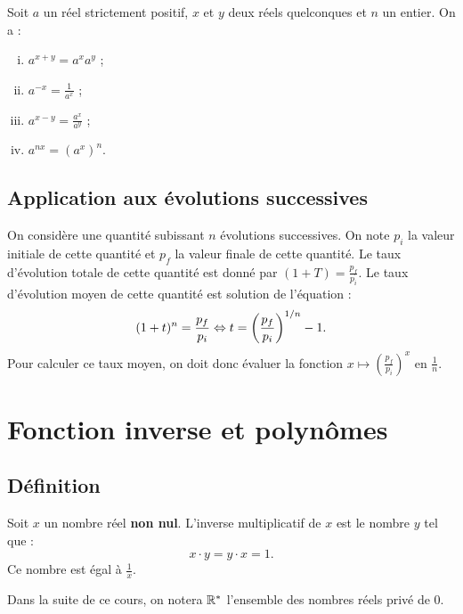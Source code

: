 \documentclass[a4paper, 12pt]{report}
\begin{document}
\begin{prop}
Soit $a$ un réel strictement positif, $x$ et $y$ deux réels quelconques et $n$ un entier. On a :
\begin{enumerate}[(i)]
\item
$a^{x+y} = a^x a^y$ ;
\item
$a^{-x} = \frac1{a^x}$ ;
\item
$a^{x-y} = \frac{a^x}{a^y}$ ;
\item
$a^{nx} = (a^x)^n$.
\end{enumerate}
\end{prop}

\section{Application aux évolutions successives}

\begin{prop}
On considère une quantité subissant $n$ évolutions successives. 
On note $p_i$ la valeur initiale de cette quantité et $p_f$ la valeur finale de cette quantité. \newline
Le taux d'évolution totale de cette quantité est donné par $(1+T) = \frac{p_f}{p_i}$.
Le taux d'évolution moyen de cette quantité est solution de l'équation :
\[ (1+t)^n = \frac{p_f}{p_i} \Leftrightarrow t = \left ( \frac{p_f}{p_i} \right ) ^{1/n} - 1 . \]
Pour calculer ce taux moyen, on doit donc évaluer la fonction $x \mapsto \left ( \frac{p_f}{p_i} \right ) ^{x}$ en $\frac1{n}$.
\end{prop}

\chapter{Fonction inverse et polynômes}

\section{Définition}

\begin{rapl}
Soit $x$ un nombre réel \textbf{non nul}. L'inverse multiplicatif de $x$ est le nombre $y$ tel que :
\[ x \cdot y = y \cdot x = 1 . \]
Ce nombre est égal à $\frac1{x}$.
\end{rapl}

\begin{nota}
Dans la suite de ce cours, on notera $\mathbb{R}^{\ast}$ l'ensemble des nombres réels privé de 0.
\end{nota}
\end{document}
